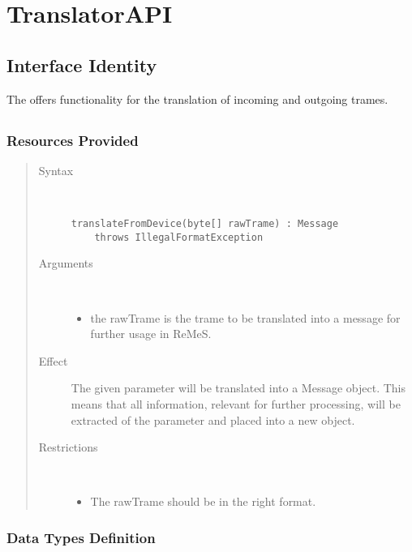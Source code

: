 \section{TranslatorAPI}
\label{api:rm-translator-api}

\subsection{Interface Identity}

\npar The  offers functionality for the translation of
incoming and outgoing trames.

\subsection{}

\subsubsection{Resources Provided}

\begin{quote}
	\begin{description}
		\item[Syntax] \
		\begin{verbatim}
translateFromDevice(byte[] rawTrame) : Message
    throws IllegalFormatException
		\end{verbatim}
		\item[Arguments] \
		\begin{itemize}
		  \item the rawTrame is the trame to be translated into a message for further
		  usage in ReMeS.
		\end{itemize}
		\item[Effect] The given parameter will be translated into a Message object.
		This means that all information, relevant for further processing, will be
		extracted of the parameter and placed into a new object.
		\item[Restrictions] \
		\begin{itemize}
		  \item The rawTrame should be in the right format.
		\end{itemize}
	\end{description} 
\end{quote}

\subsubsection{Data Types Definition}

